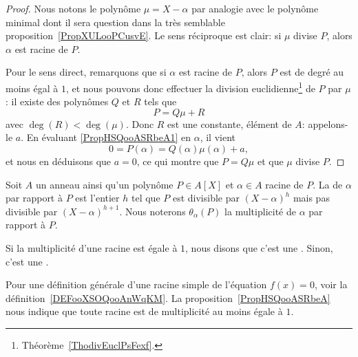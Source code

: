 \begin{proof}
	Nous notons le polynôme \( \mu=X-\alpha\) par analogie avec le polynôme minimal dont il sera question dans la très semblable proposition~\ref{PropXULooPCusvE}. Le sens réciproque est clair: si \( \mu\) divise \( P\), alors \( \alpha\) est racine de \( P\).

	Pour le sens direct, remarquons que si \( \alpha\) est racine de \( P\), alors \( P\) est de degré au moins égal à \( 1\), et nous pouvons donc effectuer la division euclidienne\footnote{Théorème~\ref{ThodivEuclPsFexf}.} de \( P\) par \( \mu\) : il existe des polynômes \( Q\) et \( R\) tels que
	\begin{equation} \label{PropHSQooASRbeA1}
		P=Q\mu+R
	\end{equation}
	avec \( \deg(R)<\deg(\mu)\). Donc \( R\) est une constante,
	élément de \( A\): appelons-le \( a\). En évaluant
	\eqref{PropHSQooASRbeA1} en \( \alpha\), il vient
	\begin{equation}
		0 = P(\alpha)=Q(\alpha)\mu(\alpha)+a,
	\end{equation}
	et nous en déduisons que \( a=0\), ce qui montre que \( P=Q\mu\) et que \( \mu\) divise \( P\).
\end{proof}

\begin{definition}     \label{DEFooTGZYooCYiKQa}
	Soit \( A\) un anneau ainsi qu'un polynôme \( P\in A[X]\) et \( \alpha\in A\) racine de \( P\). La  de \( \alpha\) par rapport à \( P\) est l'entier \( h\) tel que \( P\) est divisible par \( (X-\alpha)^h\) mais pas divisible par \( (X-\alpha)^{h+1}\).  Nous noterons \( \theta_{\alpha}(P)\) la multiplicité de \( \alpha\) par rapport à \( P\).

	Si la multiplicité d'une racine est égale à \( 1\), nous disons que c'est une . Sinon, c'est une .
\end{definition}

\begin{normaltext}
	Pour une définition générale d'une racine simple de l'équation \( f(x)=0\), voir la définition~\ref{DEFooXSOQooAnWqKM}. La proposition~\ref{PropHSQooASRbeA} nous indique que toute racine est de multiplicité au moins égale à \( 1\).
\end{normaltext}

